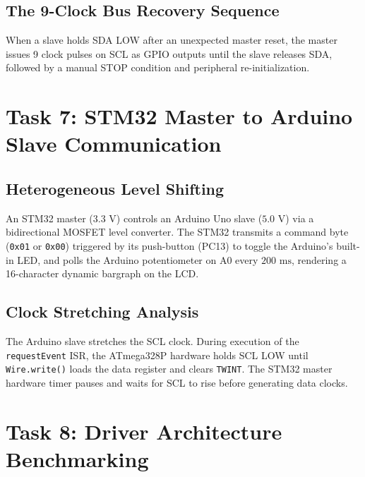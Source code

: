 \documentclass[11pt,a4paper,oneside]{report}
\begin{document}
\section{The 9-Clock Bus Recovery Sequence}
When a slave holds SDA LOW after an unexpected master reset, the master issues 9 clock pulses on SCL as GPIO outputs until the slave releases SDA, followed by a manual STOP condition and peripheral re-initialization.

\chapter{Task 7: STM32 Master to Arduino Slave Communication}

\section{Heterogeneous Level Shifting}
An STM32 master ($3.3\text{ V}$) controls an Arduino Uno slave ($5.0\text{ V}$) via a bidirectional MOSFET level converter. The STM32 transmits a command byte (\texttt{0x01} or \texttt{0x00}) triggered by its push-button (PC13) to toggle the Arduino's built-in LED, and polls the Arduino potentiometer on A0 every $200\text{ ms}$, rendering a 16-character dynamic bargraph on the LCD.

\section{Clock Stretching Analysis}
The Arduino slave stretches the SCL clock. During execution of the \texttt{requestEvent} ISR, the ATmega328P hardware holds SCL LOW until \texttt{Wire.write()} loads the data register and clears \texttt{TWINT}. The STM32 master hardware timer pauses and waits for SCL to rise before generating data clocks.

\chapter{Task 8: Driver Architecture Benchmarking}
\end{document}
